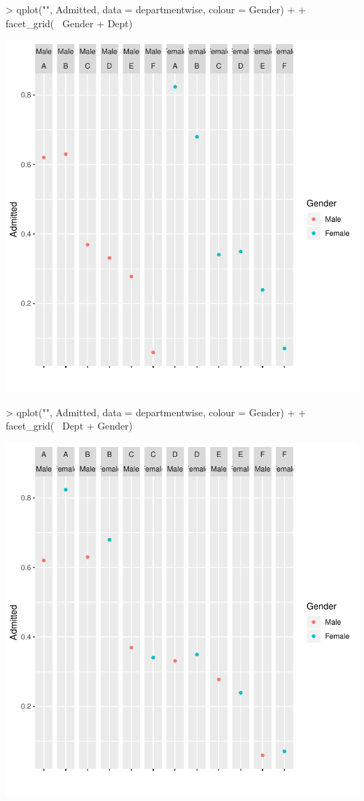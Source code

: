 \documentclass[12pt,letterpaper,final]{article}
\begin{document}
\begin{Schunk}
\begin{Sinput}
> qplot("", Admitted, data = departmentwise, colour = Gender) +
+   facet_grid(~ Gender + Dept)
\end{Sinput}
\end{Schunk}
\includegraphics{lect_main-036}

\begin{Schunk}
\begin{Sinput}
> qplot("", Admitted, data = departmentwise, colour = Gender) +
+   facet_grid(~ Dept + Gender)
\end{Sinput}
\end{Schunk}
\includegraphics{lect_main-037}
\end{document}
